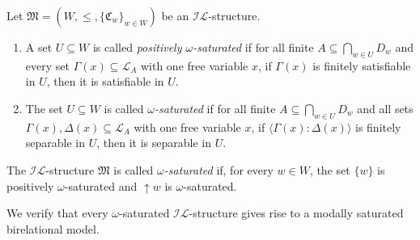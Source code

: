 \documentclass[submission,copyright,creativecommons]{eptcs}
\newcommand{\mo}{\mathfrak}
\newcommand{\IL}{\mathscr{I\!\!L}}   %
\newcommand{\LL}{\mathcal{L}}        %
\newcommand{\consec}[2]{\langle #1:#2 \rangle}
\begin{document}
\begin{definition}
  Let $\mo{M} = (W, \leq, \{ \mo{C}_w \}_{w \in W})$ be an $\IL$-structure.
  \begin{enumerate}
    \item A set $U \subseteq W$ is called \emph{positively $\omega$-saturated}
          if for all finite $A \subseteq \bigcap_{w \in U} D_w$
          and every set $\Gamma(x) \subseteq \LL_A$
          with one free variable $x$,
          if $\Gamma(x)$ is finitely satisfiable in $U$,
          then it is satisfiable in $U$.
    \item The set $U \subseteq W$ is called \emph{$\omega$-saturated}
          if for all finite $A \subseteq \bigcap_{w \in U} D_w$
          and all sets $\Gamma(x), \Delta(x) \subseteq \LL_A$
          with one free variable $x$,
          if $\consec{\Gamma(x)}{\Delta(x)}$ is finitely separable in $U$,
          then it is separable in $U$.
  \end{enumerate}
  The $\IL$-structure $\mo{M}$ is called \emph{$\omega$-saturated} if, for every $w \in W$, the set
  $\{ w \}$ is positively $\omega$-saturated
  and ${\uparrow}w$ is $\omega$-saturated.
\end{definition}

  We verify that every $\omega$-saturated $\IL$-structure gives rise to a modally saturated birelational model.
\end{document}
